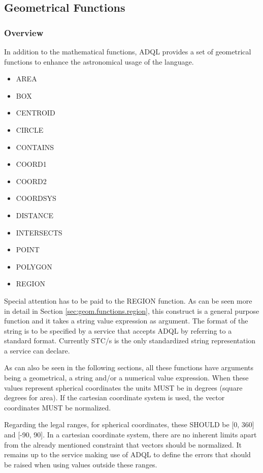 \documentclass[11pt,a4paper]{ivoa}
\begin{document}
\subsection{Geometrical Functions}
\label{sec:geom.functions}
\subsubsection{Overview}
\label{sec:geom.functions.overview}

In addition to the mathematical functions, ADQL provides a set of geometrical
functions to enhance the astronomical usage of the language.

\begin{itemize}
    \item AREA
    \item BOX
    \item CENTROID
    \item CIRCLE
    \item CONTAINS
    \item COORD1
    \item COORD2
    \item COORDSYS
    \item DISTANCE
    \item INTERSECTS
    \item POINT
    \item POLYGON
    \item REGION
\end{itemize}

Special attention has to be paid to the REGION function. As can be seen more
in detail in Section \ref{sec:geom.functions.region}, this construct is a general purpose function and
it takes a string value expression as argument. The format of the string is
to be specified by a service that accepts ADQL by referring to a standard
format. Currently STC/s is the only standardized string
representation a service can declare.

As can also be seen in the following sections, all these functions
have arguments being a geometrical, a string and/or a numerical value
expression. When these values represent spherical coordinates the units MUST
be in degrees (square degrees for area). If the cartesian coordinate system
is used, the vector coordinates MUST be normalized.

Regarding the legal ranges, for spherical coordinates, these SHOULD be [0, 360]
and [-90, 90]. In a cartesian coordinate system, there are no inherent limits
apart from the already mentioned constraint that vectors should be normalized. It remains
up to the service making use of ADQL to define the errors that should be raised
when using values outside these ranges.
\end{document}
